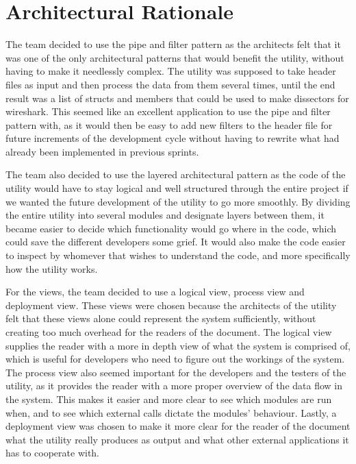 \section{Architectural Rationale}
The team decided to use the pipe and filter pattern as the architects felt that it was one of the only architectural patterns that would benefit the \gls{utility}, without having to make it needlessly complex. The \gls{utility} was supposed to take \gls{header} files as input and then process the data from them several times, until the end result was a list of \glspl{struct} and \glspl{member} that could be used to make \glspl{dissector} for \Gls{wireshark}. This seemed like an excellent application to use the pipe and filter pattern with, as it would then be easy to add new filters to the \gls{header} file for future increments of the development cycle without having to rewrite what had already been implemented in previous sprints.

The team also decided to use the layered architectural pattern as the code of the utility would have to stay logical and well structured through the entire project if we wanted the future development of the utility to go more smoothly. By dividing the entire utility into several modules and designate layers between them, it became easier to decide which functionality would go where in the code, which could save the different developers some grief. It would also make the code easier to inspect by whomever that wishes to understand the code, and more specifically how the utility works.

For the views, the team decided to use a logical view, process view and deployment view. These views were chosen because the architects of the \gls{utility} felt that these views alone could represent the system sufficiently, without creating too much overhead for the readers of the document. The logical view supplies the reader with a more in depth view of what the system is comprised of, which is useful for developers who need to figure out the workings of the system. The process view also seemed important for the developers and the testers of the \gls{utility}, as it provides the reader with a more proper overview of the data flow in the system. This makes it easier and more clear to see which modules are run when, and to see which external calls dictate the modules' behaviour. Lastly, a deployment view was chosen to make it more clear for the reader of the document what the \gls{utility} really produces as output and what other external applications it has to cooperate with. 

